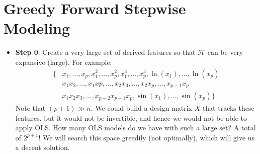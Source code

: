\documentclass[12pt, a4paper]{article}
\theoremstyle{definition}
\begin{document}
	\section*{Greedy Forward Stepwise Modeling}
	\begin{itemize}
		\item \textbf{Step 0}: Create a very large set of derived features so
		that $\mathcal{H}$ can be very expansive (large). For example:
		\begin{align*}
			\{
			&x_1,\ldots,x_p, x_1^2,\ldots,x_p^2,x_1^3,\ldots,x_p^3,\ln(x_1),\ldots,\ln(x_p)\\
			&x_1x_2,\ldots,x_1xp,\ldots,x_2x_3,\ldots,x_2x_p,\ldots,x_{p-1}x_p\\
			&x_1x_2x_3,\ldots,x_{p-2}x_{p-1}x_{p},\sin(x_1),\ldots,\sin(x_p)
			\}
		\end{align*}
		Note that $(p+1)\gg n$. We could build a design matrix $X$ that tracks these
		features, but it would not be invertible, and hence we would not be able to
		apply OLS. How many OLS models do we have with such a large set? A total of
		$2^{p+1}$! We will search this space greedily (not optimally), which will
		give us a decent solution.
		

\end{itemize}
\end{document}
